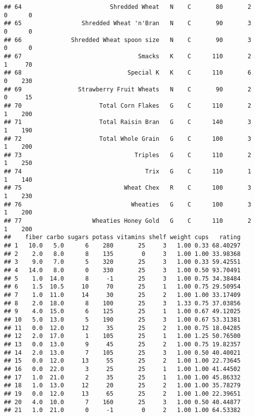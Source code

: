 \documentclass[
]{article}
\begin{document}
\begin{verbatim}
## 64                         Shredded Wheat   N    C       80       2   0      0
## 65                 Shredded Wheat 'n'Bran   N    C       90       3   0      0
## 66              Shredded Wheat spoon size   N    C       90       3   0      0
## 67                                 Smacks   K    C      110       2   1     70
## 68                              Special K   K    C      110       6   0    230
## 69                Strawberry Fruit Wheats   N    C       90       2   0     15
## 70                      Total Corn Flakes   G    C      110       2   1    200
## 71                      Total Raisin Bran   G    C      140       3   1    190
## 72                      Total Whole Grain   G    C      100       3   1    200
## 73                                Triples   G    C      110       2   1    250
## 74                                   Trix   G    C      110       1   1    140
## 75                             Wheat Chex   R    C      100       3   1    230
## 76                               Wheaties   G    C      100       3   1    200
## 77                    Wheaties Honey Gold   G    C      110       2   1    200
##    fiber carbo sugars potass vitamins shelf weight cups   rating
## 1   10.0   5.0      6    280       25     3   1.00 0.33 68.40297
## 2    2.0   8.0      8    135        0     3   1.00 1.00 33.98368
## 3    9.0   7.0      5    320       25     3   1.00 0.33 59.42551
## 4   14.0   8.0      0    330       25     3   1.00 0.50 93.70491
## 5    1.0  14.0      8     -1       25     3   1.00 0.75 34.38484
## 6    1.5  10.5     10     70       25     1   1.00 0.75 29.50954
## 7    1.0  11.0     14     30       25     2   1.00 1.00 33.17409
## 8    2.0  18.0      8    100       25     3   1.33 0.75 37.03856
## 9    4.0  15.0      6    125       25     1   1.00 0.67 49.12025
## 10   5.0  13.0      5    190       25     3   1.00 0.67 53.31381
## 11   0.0  12.0     12     35       25     2   1.00 0.75 18.04285
## 12   2.0  17.0      1    105       25     1   1.00 1.25 50.76500
## 13   0.0  13.0      9     45       25     2   1.00 0.75 19.82357
## 14   2.0  13.0      7    105       25     3   1.00 0.50 40.40021
## 15   0.0  12.0     13     55       25     2   1.00 1.00 22.73645
## 16   0.0  22.0      3     25       25     1   1.00 1.00 41.44502
## 17   1.0  21.0      2     35       25     1   1.00 1.00 45.86332
## 18   1.0  13.0     12     20       25     2   1.00 1.00 35.78279
## 19   0.0  12.0     13     65       25     2   1.00 1.00 22.39651
## 20   4.0  10.0      7    160       25     3   1.00 0.50 40.44877
## 21   1.0  21.0      0     -1        0     2   1.00 1.00 64.53382

\end{verbatim}
\end{document}
